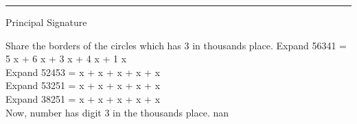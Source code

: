 \documentclass{article}%
\begin{document}
\begin{minipage}[l]{0.45\textwidth}%
\flushleft%
\centering%
\par\noindent\rule{40mm}{0.4pt} \linebreak Principal Signature%

\end{minipage}%
\newpage%
{Share the borders of the circles which has 3 in thousands place.}{}{}{}{}{}%
\linebreak%
{Expand 56341 =  5 x \underline{\hspace{2cm}} + 6 x \underline{\hspace{2cm}} + 3 x \underline{\hspace{2cm}} + 4 x \underline{\hspace{2cm}} + 1 x \underline{\hspace{2cm}}\\ Expand 52453 =  \underline{\hspace{0.4cm}} x \underline{\hspace{2cm}} + \underline{\hspace{0.4cm}} x \underline{\hspace{2cm}} + \underline{\hspace{0.4cm}} x \underline{\hspace{2cm}} + \underline{\hspace{0.4cm}} x \underline{\hspace{2cm}} + \underline{\hspace{0.4cm}} x \underline{\hspace{2cm}}\\Expand 53251 =  \underline{\hspace{0.4cm}} x \underline{\hspace{2cm}} + \underline{\hspace{0.4cm}} x \underline{\hspace{2cm}} + \underline{\hspace{0.4cm}} x \underline{\hspace{2cm}} + \underline{\hspace{0.4cm}} x \underline{\hspace{2cm}} + \underline{\hspace{0.4cm}} x \underline{\hspace{2cm}} \\Expand 38251 =  \underline{\hspace{0.4cm}} x \underline{\hspace{2cm}} + \underline{\hspace{0.4cm}} x \underline{\hspace{2cm}} + \underline{\hspace{0.4cm}} x \underline{\hspace{2cm}} + \underline{\hspace{0.4cm}} x \underline{\hspace{2cm}} + \underline{\hspace{0.4cm}} x \underline{\hspace{2cm}} \\}{Now, number \underline{\hspace{2cm}}\underline{\hspace{0.6cm}} has digit 3 in the thousands place.}{}{}{}%
\linebreak%
nan%
\end{document}
